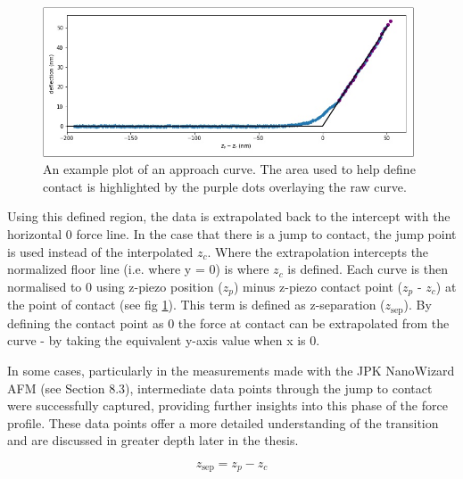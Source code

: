 \begin{figure}[h!]    
        \begin{center}
          \includegraphics[width=110mm]{chapter4/contactRegion.png}
\end{center}
\caption{An example plot of an approach curve. The area used to help define contact is highlighted by the purple dots overlaying the raw curve.} %
\label{fig:contactRegion}                
\end{figure}

Using this defined region, the data is extrapolated back to the intercept with the horizontal 0 force line. In the case that there is a jump to contact, the jump point is used instead of the interpolated $z_c$. Where the extrapolation intercepts the normalized floor line (i.e. where y = 0) is where $z_c$ is defined. Each curve is then normalised to 0 using z-piezo position ($z_p$) minus z-piezo contact point ($z_p$ - $z_c$) at the point of contact (see fig \ref{fig:contactRegion}). This term is defined as z-separation ($z_\text{sep}$). By defining the contact point as 0 the force at contact can be extrapolated from the curve - by taking the equivalent y-axis value when x is 0.

In some cases, particularly in the measurements made with the JPK NanoWizard AFM (see Section 8.3), intermediate data points through the jump to contact were successfully captured, providing further insights into this phase of the force profile. These data points offer a more detailed understanding of the transition and are discussed in greater depth later in the thesis.

\begin{equation}
z_\text{sep} = z_p - z_c
\end{equation}


